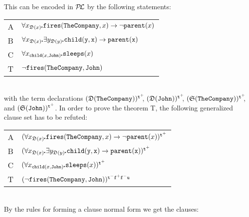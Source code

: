 \documentclass{\filespath jancl}
\makeatletter
\newcommand\COMP{{\sf TheCompany}}
\def\sdot{\rule{.3ex}{.3ex}\hspace{-0.4ex}\;} %
\newcommand{\Defined}{{\mathfrak D}}
\newcommand{\Secure}{{\mathfrak S}}
\newcommand{\undefined}{{\sf u}}
\newcommand{\twts}{{{\sf t}^+}}
\newcommand{\twfs}{{{\sf f}^+}}
\newcommand{\twti}{{{\sf t}^-}}
\newcommand{\twfi}{{{\sf f}^-}}
\def\presuppl{{\cal P\kern-.4ex L}}
\newcommand{\all}[3]{\forall {#1}_{#2}\sdot #3}
\newcommand{\ex}[3]{\exists {#1}_{#2}\sdot #3}
\def\sf{\tt}
\newcommand{\bd}{\begin{tabular}{l@{$\;\;$}l}}
\newcommand{\ed}{\end{tabular}}
\def\impl{\implies}\def\non{\neg}
\makeatother
\begin{document}
\def\somespace{0.9ex}
This can be encoded in $\presuppl$ by the following statements:\\[\somespace]
\hspace*{2ex}\begin{minipage}[t]{0.7\textwidth}
\bd
A & $\all{x}{\Defined(x)}{{\sf fires}(\COMP,x)\impl \non {\sf parent}(x)}$\\
B & $\all{x}{\Defined(x)}{\ex{y}{{\Defined(y)}} {\sf child}(y,x)\impl{\sf parent}(x)}$\\
C & $\all{x}{{\sf child}(x,{\sf John})}{{\sf sleeps}(x)}$\\[1ex]

T & $\non {\sf fires}{(\COMP,{\sf John})}$
\ed
\end{minipage}\\[\somespace]
with the term declarations $(\Defined(\COMP))^\twts\!\!$,
$(\Defined({\sf John}))^\twts\!\!$, $(\Secure(\COMP))^\twts\!\!$, and
$(\Secure({\sf John}))^\twts$.
In order to prove the theorem T, the following generalized clause set
has to be refuted:\\[\somespace]
\hspace*{2ex}\begin{minipage}[t]{0.7\textwidth}
\bd
A & $(\all{x}{\Defined(x)}{{\sf fires}(\COMP,x)\impl \non {\sf parent}(x)})^\twts$\\
B & $(\all{x}{\Defined(x)}{\ex{y}{{\Defined(y)}} {\sf child}(y,x)}\impl{\sf parent}(x))^\twts$\\
C & $(\all{x}{{\sf child}(x,{\sf John})}{{\sf sleeps}(x)})^\twts$\\[1ex]

T & $(\non {\sf fires}{(\COMP,{\sf John})})^{\twti\twfs\twfi\undefined}$
\ed
\end{minipage}\\[\somespace]
By the rules for forming a clause normal form we get the clauses:\\[\somespace]
\hspace*{2ex}
\end{document}
